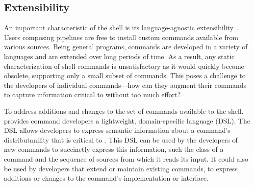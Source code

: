 \documentclass[sigplan,10pt,review,anonymous]{acmart}
\newcommand{\ttt}[1]{\texttt{\small #1}}
\newcommand{\nv}[1]{[{\color{cyan}#1 --- nv}]}
\newcommand{\kk}[1]{[{\color{magenta}#1 --- kk}]}
\begin{document}
\subsection{Extensibility}
\label{ext}



An important characteristic of the \unix shell is its language-agnostic extensibility~.
Users composing pipelines are free to install custom commands available from various sources.
Being general programs, commands are developed in a variety of languages and are extended over long periods of time.
As a result, any static characterization of shell commands is unsatisfactory as it would quickly become obsolete, supporting only a small subset of commands.
This poses a challenge to the developers of individual commands---how can they augment their commands to capture information critical to \sys without too much effort?

To address additions and changes to the set of commands available to the shell, \sys provides command developers a lightweight, domain-specific language (DSL).
The DSL allows developers to express semantic information about a command's distributanility that is critical to \sys.
This DSL can be used by the developers of new commands to succinctly express this information, such the class of a command and the sequence of sources from which it reads its input.
It could also be used by developers that extend or maintain existing commands, to express additions or changes to the command's implementation or interface.
\end{document}
